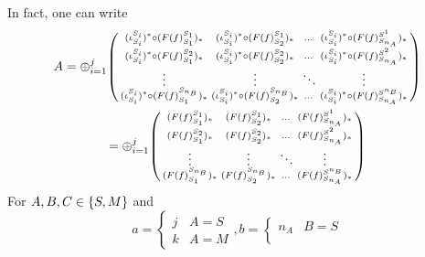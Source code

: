 \begin{remark}
    In fact, one can write
    \begin{multline*}
        A = \oplus_{i = 1}^{j}
        \begin{psmallmatrix}
            ( \iota_{S_i}^{S_i} )^* \circ ( F(f)_{S_1}^{S_1} )_* &
            ( \iota_{S_i}^{S_i} )^* \circ ( F(f)_{S_2}^{S_1} )_* &
            \dots &
            ( \iota_{S_i}^{S_i} )^* \circ ( F(f)_{S_{n_A}}^{S^1} )_* \\
            ( \iota_{S_i}^{S_i} )^* \circ ( F(f)_{S_1}^{S_2} )_* &
            ( \iota_{S_i}^{S_i} )^* \circ ( F(f)_{S_2}^{S_2} )_* &
            \dots &
            ( \iota_{S_i}^{S_i} )^* \circ ( F(f)_{S_{n_A}}^{S^2} )_* \\
            \vdots & \vdots & \ddots & \vdots \\
            ( \iota_{S_i}^{S_i} )^* \circ ( F(f)_{S_1}^{S_{n_B}} )_* &
            ( \iota_{S_i}^{S_i} )^* \circ ( F(f)_{S_2}^{S_{n_B}} )_* &
            \dots &
            ( \iota_{S_i}^{S_i} )^* \circ ( F(f)_{S_{n_A}}^{S^{n_B}} )_* \\
        \end{psmallmatrix} \\
        = \oplus_{i = 1}^{j}
        \begin{psmallmatrix}
            ( F(f)_{S_1}^{S_1} )_* &
            ( F(f)_{S_2}^{S_1} )_* &
            \dots &
            ( F(f)_{S_{n_A}}^{S^1} )_* \\
            ( F(f)_{S_1}^{S_2} )_* &
            ( F(f)_{S_2}^{S_2} )_* &
            \dots &
            ( F(f)_{S_{n_A}}^{S^2} )_* \\
            \vdots & \vdots & \ddots & \vdots \\
            ( F(f)_{S_1}^{S_{n_B}} )_* &
            ( F(f)_{S_2}^{S_{n_B}} )_* &
            \dots &
            ( F(f)_{S_{n_A}}^{S^{n_B}} )_* \\
        \end{psmallmatrix}
    \end{multline*}
    For \( A, B, C \in \{S, M\} \) and
    \[
        a = 
        \begin{cases}
            j & A = S \\
            k & A = M
        \end{cases},
        b =
        \begin{cases}
            n_A & B = S \\

\end{cases}\]
\end{remark}
